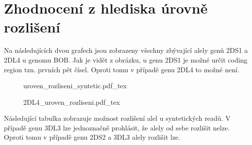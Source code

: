 \documentclass[czech,DP]{thesiskiv}
\numberwithin{equation}{section}
\begin{document}
\chapter{Zhodnocení z hlediska úrovně rozlišení}
Na následujících dvou grafech jsou zobrazeny všechny zbývající alely genů 2DS1 a 2DL4 u genomu BOB. Jak je vidět z obrázku, u genu 2DS1 je možné určit coding region tzn. prvních pět čísel. Oproti tomu v případě genu 2DL4 to možné není. 


\begin{figure}[H]
	\centering
    \def\svgwidth{\columnwidth}
    {uroven_rozliseni_syntetic.pdf_tex} 
\end{figure}

\begin{figure}[H]
	\centering
    \def\svgwidth{\columnwidth}
    {2DL4_uroven_rozliseni.pdf_tex} 
\end{figure}

\noindent
Následující tabulka zobrazuje možnost rozlišení alel u syntetických readů. V případě genu 3DL3 lze jednoznačně prohlásit, že alely od sebe rozlišit nelze. Oproti tomu v případě genu 2DS2 a 3DL3 alely rozlišit lze. 
\end{document}
